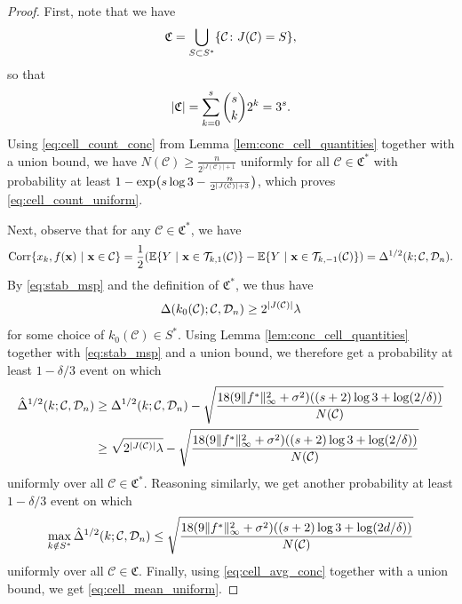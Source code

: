 \documentclass[11pt]{article}
\newcommand{\bx}{\mathbf{x}}
\DeclarePairedDelimiter{\braces}{\lbrace}{\rbrace}
\DeclarePairedDelimiter{\paren}{(}{)}
\DeclarePairedDelimiter{\abs}{|}{|}
\DeclarePairedDelimiter{\norm}{\|}{\|}
\newcommand{\E}{\mathbb{E}}
\newcommand{\cell}{\mathcal{C}}
\newcommand{\sparsity}{s}
\newcommand{\nfeats}{d}
\newcommand{\nsamples}{n}
\newcommand{\data}[1][n]{\mathcal{D}_{#1}}
\newcommand{\cellfeatindices}{J}
\newcommand{\suppset}{S^*}
\newcommand{\splitoperator}{\mathcal{T}}
\newcommand{\rid}{\Delta^{1/2}}
\newcommand{\ridhat}{\hat\Delta^{1/2}}
\newcommand{\cellcollection}{{\mathfrak{C}^*}}
\newcommand{\Corr}{\operatorname{Corr}}
\newcommand{\secondcellcollection}{\mathfrak{C}}
\begin{document}
\begin{proof}
    First, note that we have 
    \begin{equation}
        \secondcellcollection = \bigcup_{S \subset \suppset} \braces*{\cell \colon \cellfeatindices(\cell) = S},
    \end{equation}
    so that
    \begin{equation}
        \abs*{\secondcellcollection} = \sum_{k=0}^\sparsity \binom{s}{k}2^k = 3^\sparsity.
    \end{equation}
    Using \eqref{eq:cell_count_conc} from Lemma \ref{lem:conc_cell_quantities} together with a union bound, we have $N(\cell) \geq \frac{n}{2^{|\cellfeatindices(\cell)|+1}}$ uniformly for all $\cell \in \cellcollection$ with probability at least $1-\exp\paren*{\sparsity\log3 - \frac{\nsamples}{2^{|\cellfeatindices(\cell)|+3}}}$, which proves \eqref{eq:cell_count_uniform}.
    
    Next, observe that for any $\cell \in \cellcollection$, we have
    \begin{equation}
        \Corr\braces*{x_k,f(\bx)~|~\bx \in \cell} = \frac{1}{2}\paren*{\E\braces*{Y~|~\bx \in \splitoperator_{k,1}(\cell)} - \E\braces*{Y~|~\bx \in \splitoperator_{k,-1}(\cell)}} = \rid(k;\cell,\data).
    \end{equation}
    By \eqref{eq:stab_msp} and the definition of $\cellcollection$, we thus have
    \begin{equation}
        \Delta(k_0(\cell);\cell,\data) \geq 2^{\abs*{\cellfeatindices(\cell)}}\lambda
    \end{equation}
    for some choice of $k_0(\cell) \in \suppset$.
    Using Lemma \ref{lem:conc_cell_quantities} together with \eqref{eq:stab_msp} and a union bound, we therefore get a probability at least $1-\delta/3$ event on which
    \begin{equation}
    \begin{split}
        \ridhat(k;\cell,\data) & \geq \rid(k;\cell,\data) - \sqrt{\frac{18(9\norm{f^*}_\infty^2 + \sigma^2)\paren*{(s+2)\log 3 + \log(2/\delta)}}{N(\cell)}} \\
        & \geq \sqrt{2^{|\cellfeatindices(\cell)|}\lambda} - \sqrt{\frac{18(9\norm{f^*}_\infty^2 + \sigma^2)\paren*{(s+2)\log 3 + \log(2/\delta)}}{N(\cell)}}
    \end{split}
    \end{equation}
    uniformly over all $\cell \in \cellcollection$.
    Reasoning similarly, we get another probability at least $1-\delta/3$ event on which
    \begin{equation}
        \max_{k \notin \suppset}\ridhat(k;\cell,\data) \leq \sqrt{\frac{18(9\norm{f^*}_\infty^2 + \sigma^2)\paren*{(s+2)\log 3 + \log(2\nfeats/\delta)}}{N(\cell)}}
    \end{equation}
    uniformly over all $\cell \in \secondcellcollection$.
    Finally, using \eqref{eq:cell_avg_conc} together with a union bound, we get \eqref{eq:cell_mean_uniform}.
\end{proof}
\end{document}
